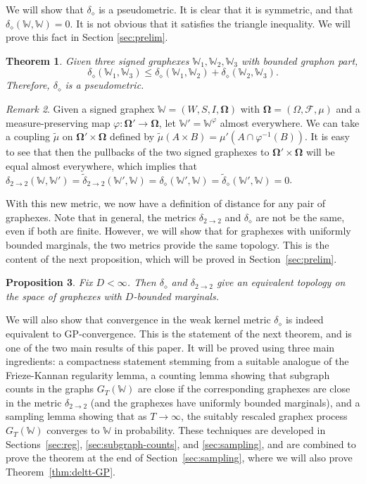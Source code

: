 \documentclass{amsart}
\numberwithin{equation}{section}
\numberwithin{figure}{section}
\newtheorem{theorem}{Theorem}[section]
\newtheorem{proposition}[theorem]{Proposition}
\theoremstyle{definition}
\theoremstyle{remark}
\newtheorem{remark}[theorem]{Remark}
\newcommand{\bOmega}{{\mathbf{\Omega}}}
\newcommand{\cW}{\mathbb{W}}
\newcommand{\cF}{\mathcal{F}}
\newcommand{\deltt}{\delta_{2\to 2}}
\def\delGP{\delta_\diamond}
\def\tdelGP{\widetilde\delta_\diamond}
\def\tdel22{{\widetilde{\delta}}_{2\to 2}}
\begin{document}
We will show that $\delGP$ is a pseudometric. It is clear that it is
symmetric, and that $\delGP(\cW,\cW)=0$. It is not obvious that it satisfies
the triangle inequality. We will prove this fact in Section \ref{sec:prelim}.

\begin{theorem} \label{thm:dmetric}
Given three signed graphexes $\cW_1,\cW_2,\cW_3$ with bounded graphon part,
\[\delGP(\cW_1,\cW_3) \le \delGP(\cW_1,\cW_2)+\delGP(\cW_2,\cW_3) .\]
Therefore, $\delGP$ is a pseudometric.
\end{theorem}

\begin{remark} \label{rem:pullbacksamedistance}
Given a signed graphex $\cW=(W,S,I,\bOmega)$ with $\bOmega=(\Omega,\cF,\mu)$
and a measure-preserving map $\varphi\colon \bOmega' \rightarrow \bOmega$,
let $\cW'=\cW^\varphi$ almost everywhere. We can take a coupling
$\widetilde{\mu}$ on $\bOmega' \times \bOmega$ defined by $\widetilde{\mu}(A
\times B)= \mu'(A \cap \varphi^{-1}(B))$. It is easy to see that then the
pullbacks of the two signed graphexes to $\bOmega' \times \bOmega$ will be
equal almost everywhere, which implies that
$\deltt(\cW,\cW')=\tdel22(\cW',\cW)=\delGP(\cW',\cW)=\tdelGP(\cW',\cW)=0$.
\end{remark}

With this new metric, we now have a definition of distance for any pair of
graphexes. Note that in general, the metrics $\deltt$ and $\delGP$ are not be
the same, even if both are finite. However, we will show that for graphexes
with uniformly bounded marginals, the two metrics provide the same topology.
This is the content of the next proposition, which will be proved in
Section~\ref{sec:prelim}.

\begin{proposition} \label{propboundedequivmetrics}
Fix $D<\infty$. Then $\delGP$ and $\deltt$ give an equivalent topology on the
space of graphexes with $D$-bounded marginals.
\end{proposition}

We will also show that convergence in the weak kernel metric $\delGP$ is
indeed equivalent to GP-convergence. This is the statement of the next
theorem, and is one of the two main results of this paper. It will be proved
using three main ingredients: a compactness statement stemming from a
suitable analogue of the Frieze-Kannan regularity lemma, a counting lemma
showing that subgraph counts in the graphs $G_T(\cW)$ are close if the
corresponding graphexes are close in the metric $\deltt$ (and the graphexes
have uniformly bounded marginals), and a sampling lemma showing that as
$T\to\infty$, the suitably rescaled graphex process $G_T(\cW)$ converges to
$\cW$ in probability. These techniques are developed in
Sections~\ref{sec:reg}, \ref{sec:subgraph-counts}, and \ref{sec:sampling},
and are combined to prove the theorem at the end of
Section~\ref{sec:sampling}, where we will also prove
Theorem~\ref{thm:deltt-GP}.
\end{document}
